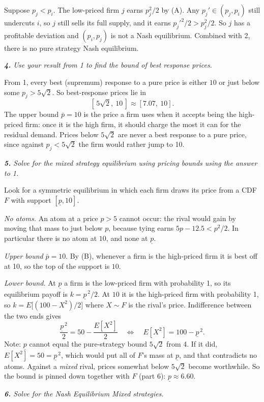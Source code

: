 \documentclass[11pt]{article}
\newcommand{\question}[1]{\par\smallskip\noindent\colorbox{black!6}{\parbox{\dimexpr\linewidth-2\fboxsep}{\itshape #1}}\par\smallskip}
\begin{document}
Suppose $p_j<p_i$. The low-priced firm $j$ earns $p_j^2/2$ by (A). Any $p_j'\in(p_j,p_i)$ still undercuts $i$, so $j$ still sells its full supply, and it earns $p_j'^2/2>p_j^2/2$. So $j$ has a profitable deviation and $(p_i,p_j)$ is not a Nash equilibrium. Combined with 2, there is no pure strategy Nash equilibrium.

\question{\textbf{4.} Use your result from 1 to find the bound of best response prices.}

From 1, every best (supremum) response to a pure price is either $10$ or just below some $p_j>5\sqrt2$. So best-response prices lie in
\[
[\,5\sqrt2,\ 10\,]\approx[7.07,\ 10].
\]
The upper bound $\bar p=10$ is the price a firm uses when it accepts being the high-priced firm: once it is the high firm, it should charge the most it can for the residual demand. Prices below $5\sqrt2$ are never a best response to a pure price, since against $p_j<5\sqrt2$ the firm would rather jump to 10.

\question{\textbf{5.} Solve for the mixed strategy equilibrium using pricing bounds using the answer to 1.}

Look for a symmetric equilibrium in which each firm draws its price from a CDF $F$ with support $[\underline p,10]$.

\emph{No atoms.} An atom at a price $p>5$ cannot occur: the rival would gain by moving that mass to just below $p$, because tying earns $5p-12.5<p^2/2$. In particular there is no atom at $10$, and none at $\underline p$.

\emph{Upper bound} $\bar p=10$. By (B), whenever a firm is the high-priced firm it is best off at 10, so the top of the support is $10$.

\emph{Lower bound.} At $\underline p$ a firm is the low-priced firm with probability 1, so its equilibrium payoff is $k=\underline p^{\,2}/2$. At $10$ it is the high-priced firm with probability 1, so $k=E\big[(100-X^2)/2\big]$ where $X\sim F$ is the rival's price. Indifference between the two ends gives
\[
\frac{\underline p^{\,2}}{2}=50-\frac{E[X^2]}{2}\quad\Longleftrightarrow\quad E[X^2]=100-\underline p^{\,2}.
\]
Note: $\underline p$ cannot equal the pure-strategy bound $5\sqrt2$ from 4. If it did, $E[X^2]=50=\underline p^{\,2}$, which would put all of $F$'s mass at $\underline p$, and that contradicts no atoms. Against a \emph{mixed} rival, prices somewhat below $5\sqrt2$ become worthwhile. So the bound is pinned down together with $F$ (part 6): $\underline p\approx6.60$.

\question{\textbf{6.} Solve for the Nash Equilibrium Mixed strategies.}
\end{document}
